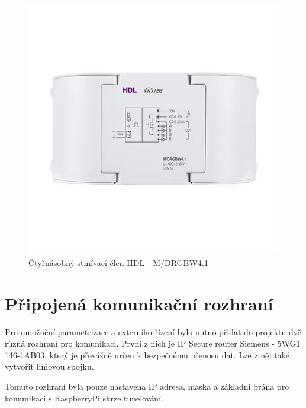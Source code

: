 \begin{figure}[!ht]
  \begin{center}
    \includegraphics[scale=0.4]{obrazky/HLD aktor2.jpg}
  \end{center}
  \caption[Čtyřnásobný stmívací člen HDL - M/DRGBW4.1 \cite{HDL aktor2}]{Čtyřnásobný stmívací člen HDL - M/DRGBW4.1 \cite{HDL aktor2}}
  \label{fig:Čtyřnásobný stmívací člen HDL - M/DRGBW4.1}
\end{figure}

\section{Připojená komunikační rozhraní}
Pro umožnění parametrizace a externího řízení bylo nutno přidat do projektu dvě různá rozhraní pro komunikaci. První z nich je IP Secure router Siemens - 5WG1 146-1AB03, který je převážně určen k bezpečnému přenosu dat. Lze z něj také vytvořit liniovou spojku. \cite{Siemens IP}

Tomuto rozhraní byla pouze nastavena IP adresa, maska a základní brána pro komunikaci s RaspberryPi skrze tunelování.

